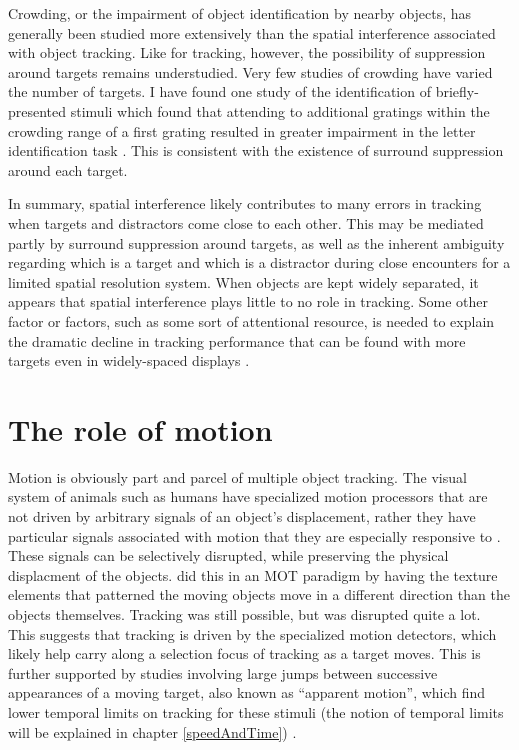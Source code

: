 \documentclass[
]{book}
\begin{document}
Crowding, or the impairment of object identification by nearby objects, has generally been studied more extensively than the spatial interference associated with object tracking. Like for tracking, however, the possibility of suppression around targets remains understudied. Very few studies of crowding have varied the number of targets. I have found one study of the identification of briefly-presented stimuli which found that attending to additional gratings within the crowding range of a first grating resulted in greater impairment in the letter identification task \citep{mareschalAttentionalModulationCrowding2010}. This is consistent with the existence of surround suppression around each target.

In summary, spatial interference likely contributes to many errors in tracking when targets and distractors come close to each other. This may be mediated partly by surround suppression around targets, as well as the inherent ambiguity regarding which is a target and which is a distractor during close encounters for a limited spatial resolution system. When objects are kept widely separated, it appears that spatial interference plays little to no role in tracking. Some other factor or factors, such as some sort of attentional resource, is needed to explain the dramatic decline in tracking performance that can be found with more targets even in widely-spaced displays \citep{holcombeObjectTrackingAbsence2014, holcombeExhaustingAttentionalTracking2012, holcombeSplittingAttentionReduces2013}.

\hypertarget{beyondLocation}{%
\chapter{The role of motion}\label{beyondLocation}}

Motion is obviously part and parcel of multiple object tracking. The visual system of animals such as humans have specialized motion processors that are not driven by arbitrary signals of an object's displacement, rather they have particular signals associated with motion that they are especially responsive to \citep{nishidaAdvancementMotionPsychophysics2011}. These signals can be selectively disrupted, while preserving the physical displacment of the objects. \citet{clairConflictingMotionInformation2010} did this in an MOT paradigm by having the texture elements that patterned the moving objects move in a different direction than the objects themselves. Tracking was still possible, but was disrupted quite a lot. This suggests that tracking is driven by the specialized motion detectors, which likely help carry along a selection focus of tracking as a target moves. This is further supported by studies involving large jumps between successive appearances of a moving target, also known as ``apparent motion'', which find lower temporal limits on tracking for these stimuli (the notion of temporal limits will be explained in chapter \ref{speedAndTime}) \citep{kanayaContributionNonattentiveMotion2012, verstratenLimitsAttentiveTracking2000}.
\end{document}
